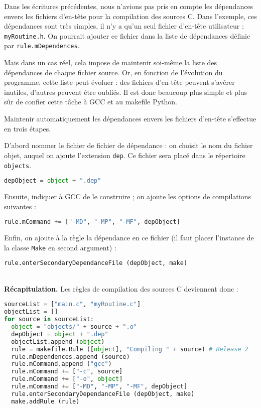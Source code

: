 \documentclass[a4paper,11pt]{extarticle}
\begin{document}
Dans les écritures précédentes, nous n'avions pas pris en compte les dépendances envers les fichiers d'en-tête pour la compilation des sources C. Dans l'exemple, ces dépendances sont très simples, il n'y a qu'un seul fichier d'en-tête utilisateur : \texttt{myRoutine.h}. On pourrait ajouter ce fichier dans la liste de dépendances définie par \texttt{rule.mDependences}.

Mais dans un cas réel, cela impose de maintenir soi-même la liste des dépendances de chaque fichier source. Or, en fonction de l'évolution du programme, cette liste peut évoluer : des fichiers d'en-tête peuvent s'avérer inutiles, d'autres peuvent être oubliés. Il est donc beaucoup plus simple et plus sûr de confier cette tâche à GCC et au makefile Python.

Maintenir automatiquement les dépendances envers les fichiers d'en-tête s'effectue en trois étapes.

D'abord nommer le fichier de fichier de dépendance : on choisit le nom du fichier objet, auquel on ajoute l'extension \texttt{dep}. Ce fichier sera placé dans le répertoire \texttt{objects}.
\begin{lstlisting}[language=py]
  depObject = object + ".dep"
\end{lstlisting}

Ensuite, indiquer à GCC de le construire ; on ajoute les options de compilations suivantes :
\begin{lstlisting}[language=py]
  rule.mCommand += ["-MD", "-MP", "-MF", depObject]
\end{lstlisting}

Enfin, on ajoute à la règle la dépendance en ce fichier (il faut placer l'instance de la classe \texttt{Make} en second argument) :
\begin{lstlisting}[language=py]
  rule.enterSecondaryDependanceFile (depObject, make)
\end{lstlisting}


~\\{\bf Récapitulation.} Les règles de compilation des sources C deviennent donc :
\begin{lstlisting}[language=py]
sourceList = ["main.c", "myRoutine.c"]
objectList = []
for source in sourceList:
  object = "objects/" + source + ".o"
  depObject = object + ".dep"
  objectList.append (object)
  rule = makefile.Rule ([object], "Compiling " + source) # Release 2
  rule.mDependences.append (source)
  rule.mCommand.append ("gcc")
  rule.mCommand += ["-c", source]
  rule.mCommand += ["-o", object]
  rule.mCommand += ["-MD", "-MP", "-MF", depObject]
  rule.enterSecondaryDependanceFile (depObject, make)
  make.addRule (rule)
\end{lstlisting}
\end{document}
